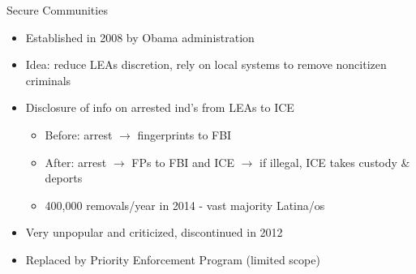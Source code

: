 \documentclass[xcolor=pdftex,dvipsnames,table]{beamer}
\begin{document}
\begin{frame}{Secure Communities}
\begin{itemize}
\item Established in 2008 by Obama administration \vspace{0.20cm}
\item Idea: reduce LEAs discretion, rely on local systems to remove noncitizen criminals \vspace{0.20cm}
\item Disclosure of info on arrested ind's from LEAs to ICE
\begin{itemize} \vspace{0.10cm}
\item Before: arrest $\rightarrow$ fingerprints to FBI  \vspace{0.10cm}
\item After: arrest $\rightarrow$ FPs to FBI and ICE $\rightarrow$ if illegal, ICE takes custody \& deports\vspace{0.10cm}
\item  400,000 removals/year in 2014 - vast majority Latina/os
\end{itemize}\vspace{0.20cm}
\item Very unpopular and criticized, discontinued in 2012\vspace{0.20cm}
\item Replaced by Priority Enforcement Program (limited scope)
\end{itemize}
\end{frame}




\end{document}
